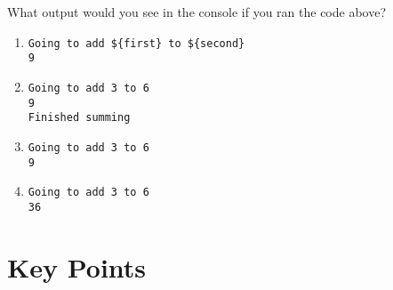 What output would you see in the console if you ran the code above?

\begin{enumerate}
\item
  \texttt{Going\ to\ add\ \$\{first\}\ to\ \$\{second\}}\\
  \texttt{9}
\item
  \texttt{Going\ to\ add\ 3\ to\ 6}\\
  \texttt{9}\\
  \texttt{Finished\ summing}
\item
  \texttt{Going\ to\ add\ 3\ to\ 6}\\
  \texttt{9}
\item
  \texttt{Going\ to\ add\ 3\ to\ 6}\\
  \texttt{36}
\end{enumerate}

\section*{Key Points}


